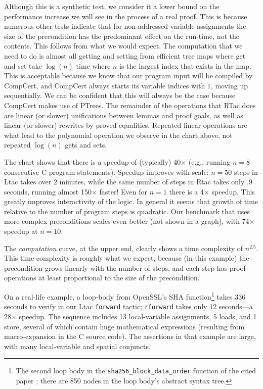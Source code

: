 \documentclass{puthesis}
\begin{document}
Although this is a synthetic test, we consider
it a lower bound on the performance increase we will see in the
process of a real proof. This is because numerous other tests
indicate that for non-addressed variable assignments the size of the
precondition has the predominant effect on the run-time, not the
contents. This follows from what we would expect. The computation that
we need to do is almost all getting and setting from efficient tree
maps where get and set take $\log(n)$ time where $n$ is the largest
index that exists in the map. This is acceptable because we know that
our program input will be compiled by CompCert, and CompCert always
starts its variable indices with $1$, moving up sequentially. We can
be confident that this will always be the case because CompCert makes
use of PTrees. The remainder of the operations that RTac does are
linear (or slower) unifications between lemmas and proof goals, as
well as linear (or slower) rewrites by proved equalities. Repeated
linear operations are what lead to the polynomial operation we observe in
the chart above, not repeated $\log(n)$ gets and sets. 

The chart shows that there 
is a speedup of (typically) 40$\times$ (e.g., running $n\! = \! 8$ consecutive
C-program statements). 
Speedup improves with scale: $n\! =\! 50$ 
steps in Ltac takes over 2 minutes, while
the same number of steps in Rtac takes only .9 seconds, running almost 150$\times$ faster! 
Even for $n\!=\!1$ there is a 4$\times$ speedup.
This greatly improves interactivity of the logic. In general it
seems that growth of time relative to the number of program steps is
quadratic. Our benchmark that uses more complex preconditions
scales even better (not shown in a graph),
with 74$\times$ speedup at $n\! = \!10$.


The \emph{computation} curve, at the upper end, clearly
shows a time complexity of $n^{2.5}$.
This time complexity is roughly what we expect,
because (in this example) the
precondition grows linearly with the number of steps,
and each step has proof operations at least proportional to the size
of the precondition.

On a real-life example, a loop-body from OpenSSL's SHA
function\footnote{The second loop body in the
  \lstinline{sha256_block_data_order} function of the cited paper
  \cite{appel15:sha}; there are 850 nodes in the loop body's abstract
  syntax tree.}  takes 336 seconds to verify in our Ltac
\lstinline{forward} tactic; \lstinline|rforward| takes only 12
seconds---a 28$\times$ speedup. The sequence includes 13
local-variable assignments, 5 loads, and 1 store, several of which
contain huge mathematical expressions (resulting from macro-expansion
in the C source code). The assertions in that example are large, with
many local-variable and spatial conjuncts.
\end{document}
